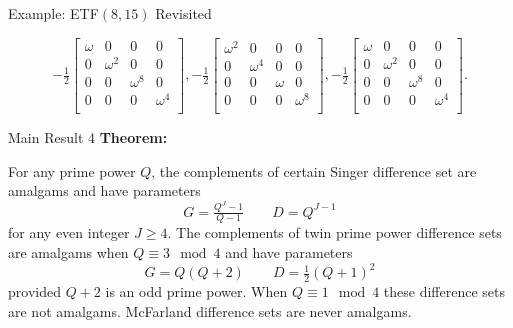 \documentclass[12pt]{beamer}
\begin{document}
\begin{frame}{Example: ETF$(8,15)$ Revisited}
\begin{footnotesize}
\begin{equation*}
\label{eq: 8x15 cross Grams}
    -\tfrac{1}{2}\left[\begin{array}{cccc}
    \omega & 0 & 0 & 0  \\
    0 & \omega^{2} & 0 & 0  \\
    0 & 0 & \omega^{8} & 0  \\
    0 & 0 & 0 & \omega^{4}  \\
    \end{array}\right], 
    -\tfrac{1}{2}\left[\begin{array}{cccc}
    \omega^{2} & 0 & 0 & 0  \\
    0 & \omega^{4} & 0 & 0  \\
    0 & 0 & \omega & 0  \\
    0 & 0 & 0 & \omega^{8}  \\
    \end{array}\right],
    -\tfrac{1}{2}\left[\begin{array}{cccc}
    \omega & 0 & 0 & 0  \\
    0 & \omega^{2} & 0 & 0  \\
    0 & 0 & \omega^{8} & 0  \\
    0 & 0 & 0 & \omega^{4}  \\
    \end{array}\right].
\end{equation*}

\end{footnotesize}

\end{frame}

\begin{frame}{Main Result 4}
\textbf{Theorem:}

For any prime power $Q$, the complements of certain Singer difference set are amalgams and have parameters 
\begin{equation*}
    G=\tfrac{Q^J-1}{Q-1} \qquad D=Q^{J-1}
\end{equation*}
for any even integer $J\geq 4$.
The complements of twin prime power difference sets are amalgams when $Q\equiv 3\mod 4$ and have parameters
\begin{equation*}
    G=Q(Q+2) \qquad D=\tfrac{1}{2}(Q+1)^2
\end{equation*}
provided $Q+2$ is an odd prime power.
When $Q\equiv 1\mod 4$ these difference sets are not amalgams.
McFarland difference sets are never amalgams.

\end{frame}
\end{document}
